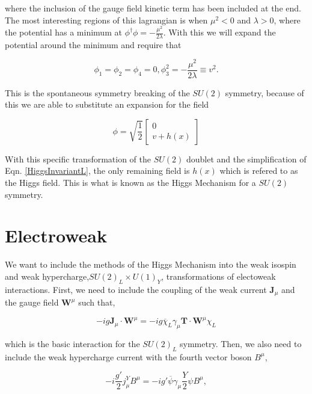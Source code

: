 where the inclusion of the gauge field kinetic term has been included at the end. The most interesting regions of this lagrangian is when $\mu^2<0$ and $\lambda>0$, where the potential has a minimum at $\phi^\dagger\phi=-\frac{\mu^2}{2\lambda}$. With this we will expand the potential around the minimum and require that

\begin{equation}
\phi_1=\phi_2=\phi_4=0, \phi_3^2=-\frac{\mu^2}{2\lambda}\equiv v^2.
\end{equation}

This is the spontaneous symmetry breaking of the $SU(2)$ symmetry, because of this we are able to substitute an expansion for the field

\begin{equation}
\phi=\sqrt{\frac{1}{2}}
\begin{bmatrix}
0 \\
v+h(x)
\end{bmatrix}
\end{equation}

With this specific transformation of the $SU(2)$ doublet and the simplification of Eqn. \ref{HiggsInvariantL}, the only remaining field is $h(x)$ which is refered to as the Higgs field. This is what is known as the Higgs Mechanism for a $SU(2)$ symmetry. 

\section{Electroweak} \label{EMWeak}

We want to include the methods of the Higgs Mechanism into the weak isospin and weak hypercharge,$SU(2)_L\times U(1)_Y$, transformations of electoweak interactions. First, we need to include the coupling of the weak current $\boldsymbol{J}_\mu$ and the gauge field $\boldsymbol{W}^\mu$ such that,

\begin{equation}
-ig\boldsymbol{J}_\mu\cdot\boldsymbol{W}^\mu=-ig\overline{\chi}_L\gamma_\mu\boldsymbol{T}\cdot\boldsymbol{W}^\mu\chi_L
\end{equation}

which is the basic interaction for the $SU(2)_L$ symmetry. Then, we also need to include the weak hypercharge current with the fourth vector boson $B^\mu$,

\begin{equation}
-i\frac{g'}{2}j_\mu^YB^\mu=-ig'\overline{\psi}\gamma_\mu\frac{Y}{2}\psi B^\mu, 
\end{equation}

